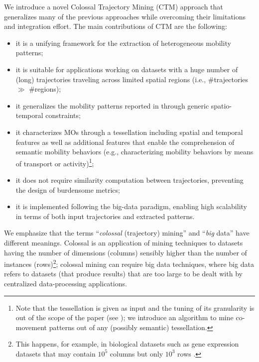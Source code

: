 \documentclass[preprint,12pt,authoryear]{elsarticle} %
\begin{document}
We introduce a novel Colossal Trajectory Mining (CTM) approach that generalizes many of the previous approaches while overcoming their limitations and integration effort. 
The main contributions of CTM are the following:
\begin{itemize}
    \item it is a unifying framework for the extraction of heterogeneous mobility patterns;
    \item it is suitable for applications working on datasets with a huge number of (long) trajectories traveling across limited spatial regions (i.e., \#trajectories $\gg$ \#regions);
    \item it generalizes the mobility patterns reported in  through generic spatio-temporal constraints;
    \item it characterizes MOs through a tessellation including spatial and temporal features as well as additional features that enable the comprehension of semantic mobility behaviors \citep{DBLP:journals/tist/Yan0PSA13} (e.g., characterizing mobility behaviors by means of transport or activity)\footnote{Note that the tessellation is given as input and the tuning of its granularity is out of the scope of the paper (see ); we introduce an algorithm to mine co-movement patterns out of any (possibly semantic) tessellation.};
    \item it does not require similarity computation between trajectories, preventing the design of burdensome metrics;
    \item it is implemented following the big-data paradigm, enabling high scalability in terms of both input trajectories and extracted patterns.
\end{itemize}
We emphasize that the terms ``\textit{colossal} (trajectory) mining'' and ``\textit{big} data'' have different meanings. Colossal \citep{DBLP:conf/kdd/PanCTYZ03} is an application of mining techniques to datasets having the number of dimensions (columns) sensibly higher than the number of instances (rows)\footnote{This happens, for example, in biological datasets such as gene expression datasets that may contain $10^5$ columns but only $10^3$ rows \citep{DBLP:conf/kdd/PanCTYZ03}.}; colossal mining can require big data techniques, where big data refers to datasets (that produce results) that are too large to be dealt with by centralized data-processing applications.
\end{document}
